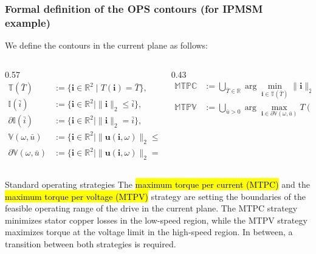
\begin{frame}
    \frametitle{Formal definition of the OPS contours (for IPMSM example)}
    We define the contours in the current plane as follows:
    \vspace{-0.2cm}
    \begin{columns}[c,onlytextwidth]
        \begin{column}{0.57\textwidth}
            \begin{align*}
                \mathbb{T}(\bar T)
                 & :={\{}\bm{i}\in\mathbb{R}^2\mid T(\bm{i})=\bar T{\}},                      \\
                \mathbb{I}(\bar i)
                 & :={\{}\bm{i}\in\mathbb{R}^2\mid \|\bm{i}\|_2\le \bar i{\}},                \\
                \partial\mathbb{I}(\bar i)
                 & :={\{}\bm{i}\in\mathbb{R}^2\mid \|\bm{i}\|_2=\bar i{\}},                   \\
                \mathbb{V}(\omega,\bar u)
                 & :={\{}\bm{i}\in\mathbb{R}^2\mid \|\bm{u}(\bm{i},\omega)\|_2\le \bar u{\}}, \\
                \partial\mathbb{V}(\omega,\bar u)
                 & :={\{}\bm{i}\in\mathbb{R}^2\mid \|\bm{u}(\bm{i},\omega)\|_2=\bar u{\}},
            \end{align*}
        \end{column}\pause%
        \begin{column}{0.43\textwidth}
            \begin{align*}
                \mathbb{MTPC}
                 & :=
                \bigcup_{\bar T\in\mathbb{R}}
                \arg\min_{\bm{i}\in\mathbb{T}(\bar T)} \|\bm{i}\|_2, \\
                \mathbb{MTPV}
                 & :=
                \bigcup_{\bar u>0}
                \arg\max_{\bm{i}\in\partial\mathbb{V}(\omega,\bar u)} T(\bm{i}).
            \end{align*}
        \end{column}
    \end{columns}
    \begin{varblock}{Standard operating strategies}
        The \hl{maximum torque per current (MTPC)} and the \hl{maximum torque per voltage (MTPV)} strategy are setting the boundaries of the feasible operating range of the drive in the current plane. The MTPC strategy minimizes stator copper losses in the low-speed region, while the MTPV strategy maximizes torque at the voltage limit in the high-speed region. In between, a transition between both strategies is required.
    \end{varblock}
\end{frame}

